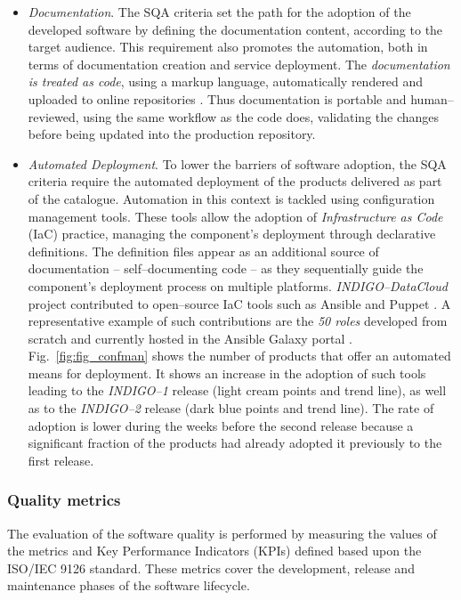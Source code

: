 \begin{itemize}
\item \textit{Documentation}.
The SQA criteria set the path for the adoption of the developed software by
defining the documentation content, according to the target audience. This requirement also
promotes the automation, both in terms of documentation creation and service deployment. The
\textit{documentation is treated as code}, using a markup language, automatically rendered and
uploaded to online repositories \cite{foot1}.
Thus documentation is portable and
human--reviewed, using the same workflow as the code does, validating the changes before being
updated into the production repository.

\item \textit{Automated Deployment}.
To lower the barriers of software adoption, the SQA criteria require the automated
deployment of the products delivered as part of the catalogue. Automation in this context is
tackled using configuration management tools. These tools allow the adoption of
\textit{Infrastructure as Code} (IaC) practice, managing the component's deployment through declarative
definitions. The definition files appear as an additional source of documentation
-- self--documenting code -- as they sequentially guide the component's deployment process on multiple
platforms. {\sl INDIGO--DataCloud} project contributed to open--source IaC tools such
as Ansible
and Puppet \cite{foot2}. A representative example of
such contributions are the \textit{50 roles} developed from scratch and currently hosted in
the Ansible Galaxy portal \cite{foot3}. Fig.~\ref{fig:fig_confman}
shows the number of products that offer an automated means for deployment.
It shows an increase in the adoption of such tools leading to the {\sl INDIGO--1} release
(light cream points and trend line), as well as to the {\sl INDIGO--2} release
(dark blue points and trend line). The rate of adoption is lower during the weeks
before the second release because a significant fraction of the products had already adopted it
previously to the first release.
\end{itemize}

\subsubsection{Quality metrics}

The evaluation of the software quality is performed by measuring the values of
the metrics and Key Performance Indicators (KPIs) defined based upon the
ISO/IEC 9126 standard. These metrics cover the development, release and
maintenance phases of the software lifecycle.

